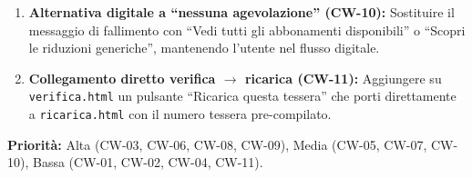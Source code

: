 \documentclass[11pt,a4paper]{article}
\begin{document}
\begin{tcolorbox}[colback=backgroundColor,colframe=accentGreen,arc=2mm]
\begin{enumerate}[leftmargin=*]
  \item \textbf{Alternativa digitale a ``nessuna agevolazione'' (CW-10):} Sostituire il messaggio di fallimento con ``Vedi tutti gli abbonamenti disponibili'' o ``Scopri le riduzioni generiche'', mantenendo l'utente nel flusso digitale.

  \item \textbf{Collegamento diretto verifica $\rightarrow$ ricarica (CW-11):} Aggiungere su \texttt{verifica.html} un pulsante ``Ricarica questa tessera'' che porti direttamente a \texttt{ricarica.html} con il numero tessera pre-compilato.
\end{enumerate}

\vspace{0.3cm}
\noindent\textbf{Priorità:} Alta (CW-03, CW-06, CW-08, CW-09), Media (CW-05, CW-07, CW-10), Bassa (CW-01, CW-02, CW-04, CW-11).
\end{tcolorbox}

\vspace{0.3cm}
\end{document}
